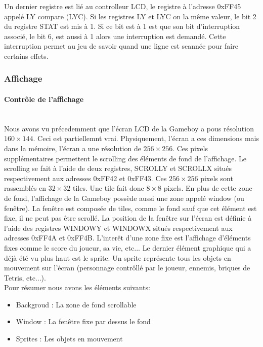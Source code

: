 \documentclass[a4paper]{article}
\begin{document}
Un dernier registre est lié au controlleur LCD, le registre à l'adresse 0xFF45
appelé LY compare (LYC). Si les registres LY et LYC on la même valeur, le bit 2
du registre STAT est mis à 1. Si ce bit est à 1 est que son bit d'interruption associé,
le bit 6, est aussi à 1 alors une interruption est demandé. Cette interruption
permet au jeu de savoir quand une ligne est scannée pour faire certains effets.

\subsubsection{Affichage}
\paragraph{Contrôle de l'affichage} \mbox{} \\

Nous avons vu précedemment que l'écran LCD de la Gameboy a pous résolution
$160 \times 144$. Ceci est partiellemnt vrai. Physiquement, l'écran a ces dimensions
mais dans la mémoire, l'écran a une résolution de $256 \times 256$. Ces pixels
supplémentaires permettent le scrolling des éléments de fond de l'affichage. Le
scrolling se fait à l'aide de deux registres, SCROLLY et SCROLLX situés respectivement
aux adresses 0xFF42 et 0xFF43. Ces $256 \times 256$ pixels sont rassemblés en $32 \times 32$ tiles.
Une tile fait donc $8 \times 8$ pixels. En plus de cette zone de fond, l'affichage de la
Gameboy possède aussi une zone appelé window (ou fenêtre). La fenêtre est composée
de tiles, comme le fond sauf que cet élément est fixe, il ne peut pas être scrollé.
La position de la fenêtre sur l'écran est définie à l'aide des registres WINDOWY
et WINDOWX situés respectivement aux adresses 0xFF4A et 0xFF4B.
L'interêt d'une zone fixe est l'affichage d'éléments fixes comme le score du joueur,
sa vie, etc... Le dernier élément graphique qui a déjà été vu plus haut est le sprite.
Un sprite représente tous les objets en mouvement sur l'écran (personnage contrôllé par
le joueur, ennemis, briques de Tetris, etc...). \\

Pour résumer nous avons les éléments suivants:
\begin{itemize}[label=\textbullet]
	\item Backgroud : La zone de fond scrollable
	\item Window : La fenêtre fixe par dessus le fond
	\item Sprites : Les objets en mouvement
\end{itemize} \bigbreak
\end{document}
